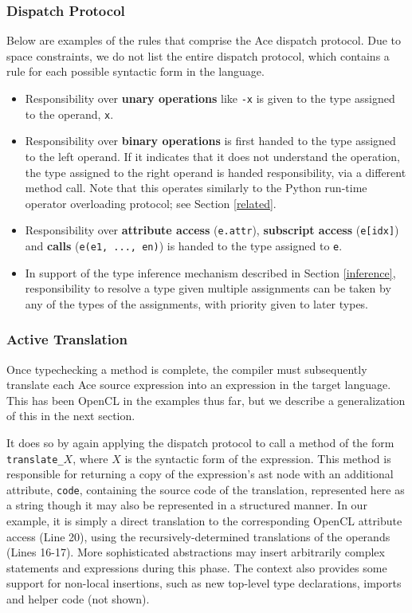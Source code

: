 \documentclass[9pt,preprint]{sigplanconf}
\begin{document}
\subsubsection{Dispatch Protocol}
Below are examples of the rules that comprise the Ace dispatch protocol. Due to space constraints, we do not list the entire dispatch protocol, which contains a rule for each possible syntactic form in the language.
\begin{itemize}
\item Responsibility over {\bf unary operations} like \verb|-x| is given to the type assigned to the operand, \verb|x|.
\item Responsibility over {\bf binary operations} is first handed to the type assigned to the left operand. If it indicates that it does not understand the operation, the type assigned to the right operand is handed responsibility, via a different method call. {Note that this operates similarly to the Python run-time operator overloading protocol; see Section \ref{related}.}
\item Responsibility over {\bf attribute access} (\texttt{e.attr}), {\bf subscript access} (\texttt{e[idx]}) and \textbf{calls} (\verb|e(e1, ..., en)|) is handed to the type assigned to \texttt{e}.
\item In support of the type inference mechanism described in Section \ref{inference}, responsibility to resolve a type given multiple assignments can be taken by any of the types of the assignments, with priority given to later types.
\end{itemize}



\subsubsection{Active Translation}
Once typechecking a method is complete, the compiler must subsequently translate each Ace source expression into an expression in the target language. This has been OpenCL in the examples thus far, but we describe a generalization of this in the next section. 

It does so by again applying the dispatch protocol to call a method of the form \verb|translate_|$X$, where $X$ is the syntactic form of the expression. This method is responsible for returning a copy of the expression's ast node with an additional attribute, \verb|code|, containing the source code of the translation, represented here as a string though it may also be represented in a structured manner. In our example, it is simply a direct translation to the corresponding OpenCL attribute access (Line 20), using the recursively-determined translations of the operands (Lines 16-17).  More sophisticated abstractions may insert arbitrarily complex statements and expressions during this phase. The context also provides some support for non-local insertions, such as new top-level type declarations, imports and helper code (not shown).
\end{document}
